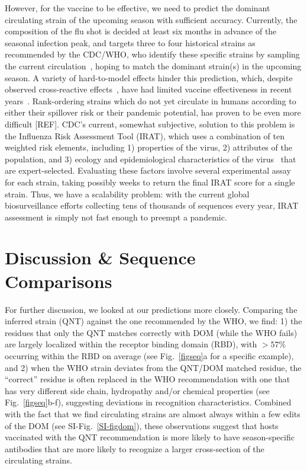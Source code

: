 \documentclass[onecolumn, compsoc,10pt]{IEEEtran}
\begin{document}
{{  However, for the  vaccine to be effective, we need to  predict the dominant circulating strain of the upcoming season with sufficient accuracy.
  Currently, the composition of the flu shot is decided at least six months in advance of the seasonal infection peak, and targets three to four  historical strains as recommended by the CDC/WHO, who identify these specific strains by  sampling the current circulation~\cite{agor2018models}, hoping to match the  dominant strain(s) in the upcoming season. A variety of hard-to-model effects hinder this prediction, which, despite observed cross-reactive effects~\cite{tricco2013comparing}, have had  limited vaccine effectiveness in recent years~\cite{cdceff}. Rank-ordering strains which do not yet circulate in humans according to either their spillover risk or their pandemic potential, has proven to be even more difficult [REF]. CDC's current, somewhat subjective, solution to this problem is the Influenza Risk Assessment Tool (IRAT), which  uses a combination of ten weighted risk elements, including  1) properties of the virus, 2) attributes of the population, and 3) ecology and epidemiological characteristics of the virus~\cite{Influenz24:online} that are expert-selected. Evaluating these factors involve several experimental assay for each strain, taking possibly weeks to return the final IRAT  score for a single strain. Thus, we have a scalability problem: with  the current global biosurveillance efforts  collecting tens of thousands of sequences every year, IRAT assessment is simply not fast enough to  preempt a pandemic. }



\section*{Discussion \& Sequence Comparisons}

For further discussion, we looked at our \qnet predictions more closely. Comparing the \qnet inferred strain (QNT) against the one recommended by the WHO, we find: 1) the residues that only the QNT matches correctly with DOM (while the WHO fails) are largely localized within the receptor binding domain (RBD), with $>57\%$ occurring within  the RBD on average (see Fig.~\ref{figseq}a for a specific example), and 2) when the WHO strain deviates from  the QNT/DOM  matched residue, the ``correct'' residue is often replaced in the WHO recommendation with one that has very different side chain, hydropathy  and/or chemical properties (see Fig.~\ref{figseq}b-f), suggesting deviations in recognition characteristics. Combined with the fact that we find circulating strains are almost always within a few edits of the DOM (see SI-Fig.~\ref{SI-figdom}), these observations suggest that hosts vaccinated with the QNT recommendation is more likely to have season-specific antibodies that are more likely to recognize a larger cross-section of the circulating strains.

}
\end{document}

